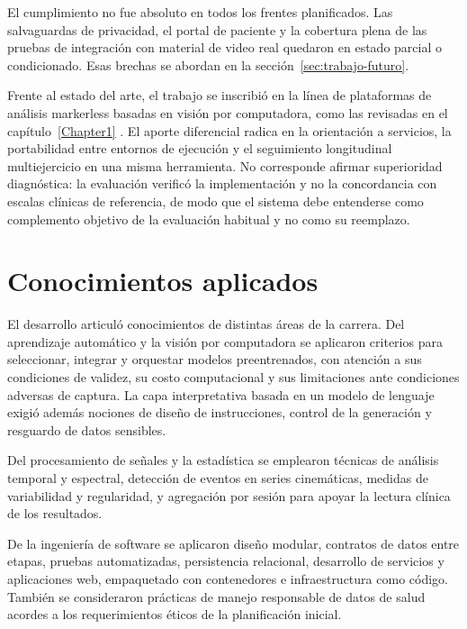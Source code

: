 El cumplimiento no fue absoluto en todos los frentes planificados. Las salvaguardas de privacidad, el portal de paciente y la cobertura plena de las pruebas de integración con material de video real quedaron en estado parcial o condicionado. Esas brechas se abordan en la sección~\ref{sec:trabajo-futuro}.

Frente al estado del arte, el trabajo se inscribió en la línea de plataformas de análisis markerless basadas en visión por computadora, como las revisadas en el capítulo~\ref{Chapter1} \citep{acevedo2025visionmd,sibley2021video,pecoraro2025computer}. El aporte diferencial radica en la orientación a servicios, la portabilidad entre entornos de ejecución y el seguimiento longitudinal multiejercicio en una misma herramienta. No corresponde afirmar superioridad diagnóstica: la evaluación verificó la implementación y no la concordancia con escalas clínicas de referencia, de modo que el sistema debe entenderse como complemento objetivo de la evaluación habitual y no como su reemplazo.


\section{Conocimientos aplicados}

El desarrollo articuló conocimientos de distintas áreas de la carrera. Del aprendizaje automático y la visión por computadora se aplicaron criterios para seleccionar, integrar y orquestar modelos preentrenados, con atención a sus condiciones de validez, su costo computacional y sus limitaciones ante condiciones adversas de captura. La capa interpretativa basada en un modelo de lenguaje exigió además nociones de diseño de instrucciones, control de la generación y resguardo de datos sensibles.

Del procesamiento de señales y la estadística se emplearon técnicas de análisis temporal y espectral, detección de eventos en series cinemáticas, medidas de variabilidad y regularidad, y agregación por sesión para apoyar la lectura clínica de los resultados.

De la ingeniería de software se aplicaron diseño modular, contratos de datos entre etapas, pruebas automatizadas, persistencia relacional, desarrollo de servicios y aplicaciones web, empaquetado con contenedores e infraestructura como código. También se consideraron prácticas de manejo responsable de datos de salud acordes a los requerimientos éticos de la planificación inicial.

